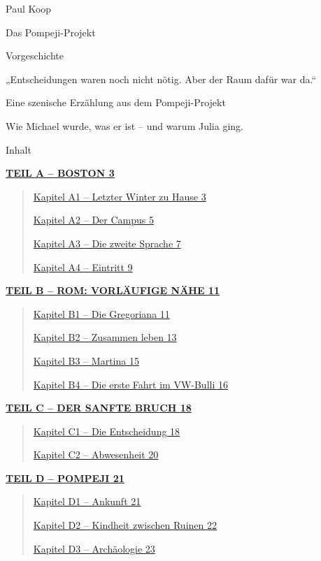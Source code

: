 \documentclass[
]{article}
\author{}
\date{}
\begin{document}
{
\setcounter{tocdepth}{3}
\tableofcontents
}
Paul Koop

Das Pompeji-Projekt

Vorgeschichte

„Entscheidungen waren noch nicht nötig. Aber der Raum dafür war da.``

Eine szenische Erzählung aus dem Pompeji-Projekt

Wie Michael wurde, was er ist -- und warum Julia ging.

Inhalt

\hyperref[teil-a-boston]{\textbf{TEIL A -- BOSTON 3}}

\begin{quote}
\hyperref[kapitel-a1-letzter-winter-zu-hause]{Kapitel A1 -- Letzter Winter zu Hause 3}

\hyperref[kapitel-a2-der-campus]{Kapitel A2 -- Der Campus 5}

\hyperref[kapitel-a3-die-zweite-sprache]{Kapitel A3 -- Die zweite Sprache 7}

\hyperref[kapitel-a4-eintritt]{Kapitel A4 -- Eintritt 9}
\end{quote}

\hyperref[teil-b-rom-vorluxe4ufige-nuxe4he]{\textbf{TEIL B -- ROM: VORLÄUFIGE NÄHE 11}}

\begin{quote}
\hyperref[kapitel-b1-die-gregoriana]{Kapitel B1 -- Die Gregoriana 11}

\hyperref[kapitel-b2-zusammen-leben]{Kapitel B2 -- Zusammen leben 13}

\hyperref[kapitel-b3-martina]{Kapitel B3 -- Martina 15}

\hyperref[kapitel-b4-die-erste-fahrt-im-vw-bulli]{Kapitel B4 -- Die erste Fahrt im VW-Bulli 16}
\end{quote}

\hyperref[teil-c-der-sanfte-bruch]{\textbf{TEIL C -- DER SANFTE BRUCH 18}}

\begin{quote}
\hyperref[kapitel-c1-die-entscheidung]{Kapitel C1 -- Die Entscheidung 18}

\hyperref[kapitel-c2-abwesenheit]{Kapitel C2 -- Abwesenheit 20}
\end{quote}

\hyperref[teil-d-pompeji]{\textbf{TEIL D -- POMPEJI 21}}

\begin{quote}
\hyperref[kapitel-d1-ankunft]{Kapitel D1 -- Ankunft 21}

\hyperref[kapitel-d2-kindheit-zwischen-ruinen]{Kapitel D2 -- Kindheit zwischen Ruinen 22}

\hyperref[kapitel-d3-archuxe4ologie]{Kapitel D3 -- Archäologie 23}
\end{quote}
\end{document}
